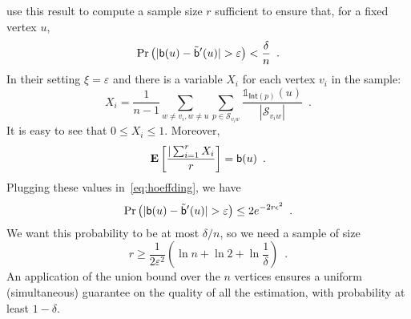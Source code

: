 \citet{BrandesP07} use this result to compute a sample size $r$ sufficient to ensure that, for
a fixed vertex $u$,
\[ 
\Pr\left(|\betw(u)-\tilde\betw'(u)|>\varepsilon\right)<\frac{\delta}{n}\enspace.
\]
In their setting $\xi=\varepsilon$ and there is a variable $X_i$ for
each vertex $v_i$ in the sample:
\[ 
X_i=\frac{1}{n-1}\sum_{w\neq v_i,w\neq
u}\sum_{p\in\mathcal{S}_{v_iw}}\frac{\mathds{1}_{\mathsf{Int}(p)}(u)}{|\mathcal{S}_{v_iw}|}\enspace
.
\]
It is easy to see that $0\le X_i\le 1$. Moreover,
\[
  \mathbf{E}\left[\frac{|\sum_{i=1}^r X_i}{r}\right] = \mathsf{b}(u)\enspace.
\]
Plugging these values in~\eqref{eq:hoeffding}, we have
\[
\Pr\left(|\betw(u)-\tilde\betw'(u)|>\varepsilon\right)\leq
2e^{-2r\epsilon^2}\enspace.
\]
We want this probability to be at most $\delta/n$, so we need a sample of size
\[
r\geq \frac{1}{2\varepsilon^2}\left(\ln n + \ln 2 +\ln\frac{1}{\delta}\right)\enspace.
\]
An application of the union bound over the $n$ vertices ensures a uniform
(simultaneous) guarantee on the quality of
all the estimation, with probability at least $1-\delta$.

